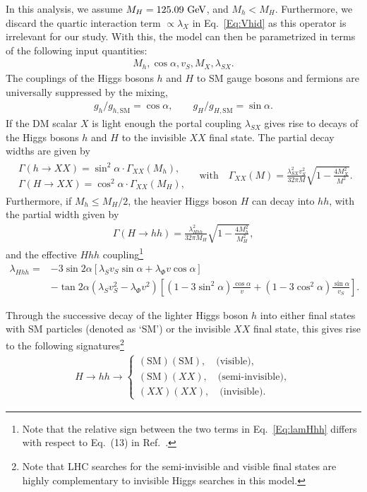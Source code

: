 \documentclass[../report.tex]{subfiles}
\begin{document}
In this analysis, we assume $M_H = 125.09~\text{GeV}$, and $M_h < M_H$. Furthermore, we discard the quartic interaction term $\propto \lambda_X$ in Eq.~\eqref{Eq:Vhid} as this operator is irrelevant for our study. With this, the model can then be parametrized in terms of the following input quantities:
\begin{align}
M_h, \cos\alpha, v_S, M_X, \lambda_{SX}.
\end{align}
The couplings of the Higgs bosons $h$ and $H$ to SM gauge bosons and fermions are universally suppressed by the mixing,
\begin{align}
g_h/g_{h,\mathrm{SM}} = \cos \alpha , \qquad g_H/g_{H,\mathrm{SM}} = \sin\alpha.
\end{align}
If the DM scalar $X$ is light enough the portal coupling $\lambda_{SX}$ gives rise to decays of the Higgs bosons $h$ and $H$ to the invisible $XX$ final state. The partial decay widths are given by
\begin{align}
\label{eq:invdecaywidth}
\begin{array}{l} \Gamma(h\to XX) = \sin^2\alpha \cdot \Gamma_{XX} (M_h), \\ \Gamma(H\to XX) = \cos^2\alpha \cdot \Gamma_{XX} (M_H), \end{array} \quad \mbox{with} \quad \Gamma_{XX}(M) = \frac{\lambda_{SX}^2 v_S^2 }{32\pi M} \sqrt{1 - \frac{4M_X^2}{M^2}}.
\end{align}
Furthermore, if $M_h \le M_H/2$, the heavier Higgs boson $H$ can decay into $hh$, with the partial width given by
\begin{align}
\Gamma(H\to hh) = \frac{\lambda_{Hhh}^2}{32\pi M_H} \sqrt{1 - \frac{4M_h^2}{M_H^2}},
\end{align}
and the effective $Hhh$ coupling\footnote{Note that the relative sign between the two terms in Eq.~\eqref{Eq:lamHhh} differs with respect to Eq.~(13) in Ref.~\cite{Englert:2011yb}.}
\begin{align}
\label{Eq:lamHhh}
\lambda_{Hhh} = & - 3\sin2\alpha \left[ \lambda_S v_S \sin\alpha  + \lambda_{\Phi} v \cos\alpha \right] \nonumber\\
& - \tan2\alpha \left( \lambda_S v_S^2 - \lambda_{\Phi} v^2 \right) \left[ (1-3\sin^2\alpha) \frac{\cos\alpha}{v} + (1-3 \cos^2\alpha) \frac{\sin\alpha}{v_S} \right].
\end{align}


Through the successive decay of the lighter Higgs boson $h$ into either final states with SM particles (denoted as `SM') or the invisible $XX$ final state, this gives rise to the following signatures\footnote{{Note that LHC searches for the semi-invisible and visible final states are highly complementary to invisible Higgs searches in this model.}}
\begin{align}
H \to hh \to \left\{ \begin{array}{l} (\mathrm{SM}) (\mathrm{SM}) ,\quad \mbox{(visible)}, \\ (\mathrm{SM}) (XX) ,\quad \mbox{(semi-invisible)}, \\
(XX) (XX) ,\quad \mbox{(invisible)}.
\end{array} \right.
\end{align}
\end{document}
